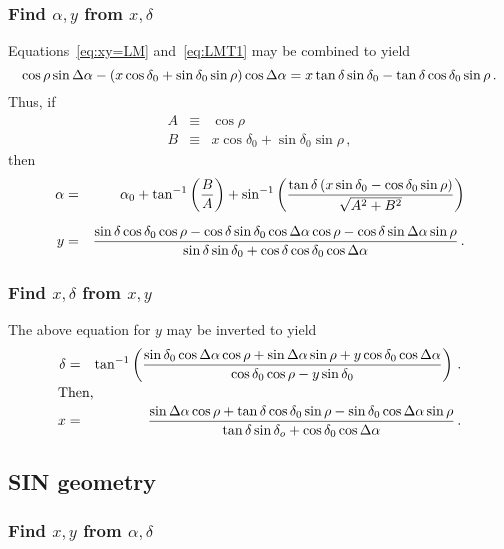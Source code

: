 \subsubsection{Find $\alpha,y$ from $x,\delta$}

Equations~\ref{eq:xy=LM} and~\ref{eq:LMT1} may be combined to yield
\begin{displaymath}
  \cos\rho\sin\Delta\alpha - (x \cos\delta_0 + \sin\delta_0\sin\rho) \cos\Delta\alpha
       = x \tan\delta \sin\delta_0 - \tan\delta \cos\delta_0 \sin\rho
       \, .
\end{displaymath}
Thus, if
\begin{eqnarray*}
  A & \equiv & \cos\rho \\
  B & \equiv & x \cos\delta_0+\sin\delta_0\sin\rho \, ,
\end{eqnarray*}
then
\begin{eqnarray*}
  \alpha &=& \alpha_0+\tan^{-1}\left(\frac{B}{A}\right) +
      \sin^{-1}\left( \frac{\tan\delta\,(x \sin\delta_0-\cos\delta_0
      \sin\rho)}{\sqrt{A^2+B^2}}\right) \\
 \noalign{\vskip 6pt}
  y &=& \frac{\sin\delta \cos\delta_0\cos\rho - \cos\delta\sin\delta_0
         \cos\da \cos\rho - \cos\delta\sin\da
         \sin\rho}{\sin\delta \sin\delta_0+\cos\delta\cos\delta_0
         \cos\da} \, .
\end{eqnarray*}

\subsubsection{Find $x,\delta$ from $x,y$}

The above equation for $y$ may be inverted to yield
\begin{eqnarray*}
\delta & = & \tan^{-1} \left( \frac{\sin\delta_0 \cos\da
      \cos\rho + \sin\da\sin\rho +
      y\cos\delta_0\cos\da}{\cos\delta_0 \cos\rho
      -y \sin\delta_0}\right) \, . \\
\noalign{\hbox{Then,}}
x & = &\frac{\sin\da\cos\rho + \tan\delta\cos\delta_0\sin\rho -
      \sin\delta_0\cos\da\sin\rho}{\tan\delta\sin\delta_o +
      \cos\delta_0 \cos\da} \, .
\end{eqnarray*}

\subsection{SIN geometry}
\subsubsection{Find $x,y$ from $\alpha,\delta$}

